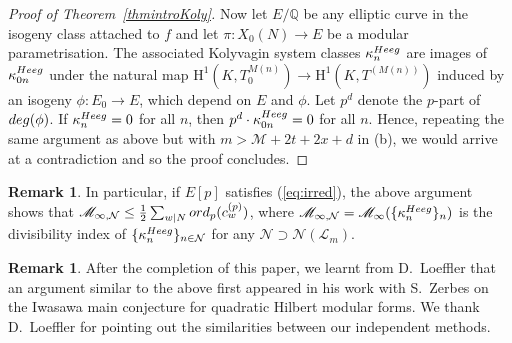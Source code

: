 \documentclass[10pt,reqno]{amsart}
\numberwithin{equation}{section}
\theoremstyle{plain}
\theoremstyle{definition}
\newtheorem{rem}[thm]{Remark}
\theoremstyle{definition}
\theoremstyle{plain}
\theoremstyle{plain}
\theoremstyle{plain}
\theoremstyle{plain}
\theoremstyle{plain}
\theoremstyle{plain}
\newcommand{\Q}{\mathbb{Q}}
\newcommand{\cL}{\mathcal{L}}
\newcommand{\cN}{\mathcal{N}}
\newcommand{\rH}{\mathrm{H}}
\begin{document}
\begin{proof}[Proof of Theorem~\ref{thmintroKoly}]
Now let $E/\Q$ be any elliptic curve in the isogeny class attached to $f$ and let $\pi: X_{0}(N) \rightarrow E$ be a modular parametrisation. 
The associated Kolyvagin system classes $\kappa_n^{\rm Heeg}$ are images of $\kappa_{0n}^{\rm Heeg}$ under the natural map $\rH^1(K,T_0^{M(n)})\rightarrow\rH^1(K,T^{(M(n))})$ induced by an isogeny $\phi:E_0\rightarrow E$, which depend on $E$ and $\phi$. Let $p^d$ denote the $p$-part of ${\rm deg}(\phi)$. If $\kappa_{n}^{\rm Heeg}=0$ for all $n$, then $p^{d}\cdot\kappa_{0n}^{\rm Heeg}=0$ for all $n$. Hence, repeating the same argument as above but with $m>\mathcal{M}+2t+2x+d$ in (b), we would arrive at a contradiction and so the proof concludes. 
\end{proof}

\begin{rem}\label{rem:upperbound}
In particular, if $E[p]$ satisfies (\ref{eq:irred}), the above argument shows that 
$\mathscr{M}_{\infty,\cN}\leq\tfrac{1}{2}\sum_{w\mid N}{\rm ord}_p(c_w^{(p)})$, 
where $\mathscr{M}_{\infty,\cN}=\mathscr{M}_\infty(\{\kappa_n^{\rm Heeg}\}_n)$ is the divisibility index of $\{\kappa_n^{\rm Heeg}\}_{n\in\mathcal{N}}$ 
for any $\cN \supset \cN(\cL_m)$.
\end{rem}

\begin{rem}
After the completion of this paper, we learnt from D.~Loeffler that an argument similar to the above first appeared in his work with S.~Zerbes \cite{LZ-quadratic} on the Iwasawa main conjecture for quadratic Hilbert modular forms.
%
We thank D.~Loeffler for pointing out the similarities between our independent methods.
\end{rem}
\end{document}
